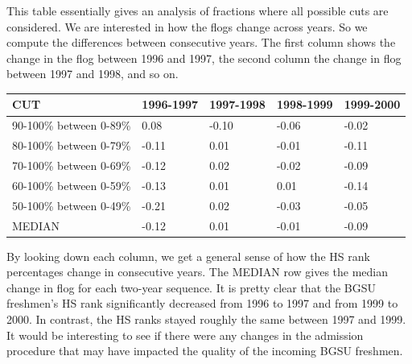 \documentclass[
]{book}
\begin{document}
This table essentially gives an analysis of fractions where all possible cuts are considered. We are interested in how the flogs change across years. So we compute the differences between consecutive years. The first column shows the change in the flog between 1996 and 1997, the second column the change in flog between 1997 and 1998, and so on.

\begin{longtable}[]{@{}lllll@{}}
\toprule
CUT & 1996-1997 & 1997-1998 & 1998-1999 & 1999-2000 \\
\midrule
\endhead
90-100\% between 0-89\% & 0.08 & -0.10 & -0.06 & -0.02 \\
80-100\% between 0-79\% & -0.11 & 0.01 & -0.01 & -0.11 \\
70-100\% between 0-69\% & -0.12 & 0.02 & -0.02 & -0.09 \\
60-100\% between 0-59\% & -0.13 & 0.01 & 0.01 & -0.14 \\
50-100\% between 0-49\% & -0.21 & 0.02 & -0.03 & -0.05 \\
MEDIAN & -0.12 & 0.01 & -0.01 & -0.09 \\
\bottomrule
\end{longtable}

By looking down each column, we get a general sense of how the HS rank percentages change in consecutive years. The MEDIAN row gives the median change in flog for each two-year sequence. It is pretty clear that the BGSU freshmen's HS rank significantly decreased from 1996 to 1997 and from 1999 to 2000. In contrast, the HS ranks stayed roughly the same between 1997 and 1999. It would be interesting to see if there were any changes in the admission procedure that may have impacted the quality of the incoming BGSU freshmen.

  
\end{document}
